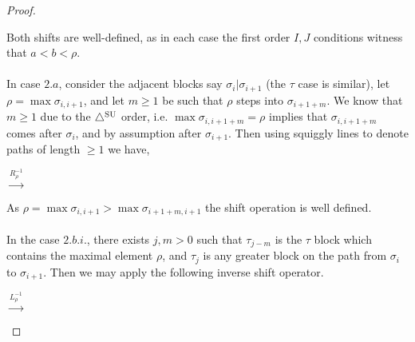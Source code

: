 \begin{proof}
\begin{center}
\end{center}
Both shifts are well-defined, as in each case the first order $I,J$ conditions witness that $a<b<\rho$.
\\\\
In case $2.a$, consider the adjacent blocks say $\sigma_i|\sigma_{i+1}$ (the $\tau$ case is similar), let $\rho=\max \sigma_{i,i+1}$, and let $m\geq 1$ be such that $\rho$ steps into $\sigma_{i+1+m}$. We know that $m\geq 1$ due to the $\triangle^{\mathrm{SU}}$ order, i.e. $\max \sigma_{i,i+1+m} = \rho$ implies that $\sigma_{i,i+1+m}$ comes after $\sigma_{i}$, and by assumption after $\sigma_{i+1}$. Then using squiggly lines to denote paths of length $\geq 1$ we have,
\begin{center}
$\xrightarrow{R_\rho^{-1}}$
\end{center}
As $\rho=\max \sigma_{i,i+1} > \max\sigma_{i+1+m,i+1}$ the shift operation is well defined.
\\\\
In the case $2.b.i.$, there exists $j,m>0$ such that $\tau_{j-m}$ is the $\tau$ block which contains the maximal element $\rho$, and $\tau_j$ is any greater block on the path from $\sigma_i$ to $\sigma_{i+1}$. Then we may apply the following inverse shift operator.
\begin{center}
$\xrightarrow{L_\rho^{-1}}$
\end{center}
\end{proof}
